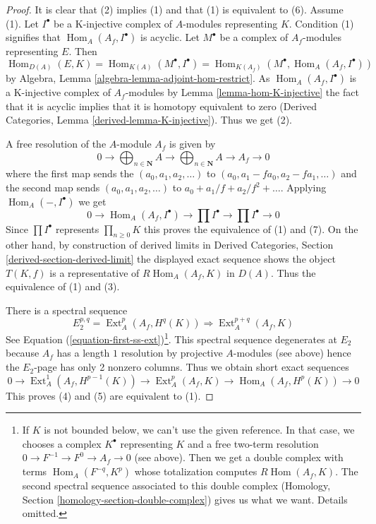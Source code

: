 \documentclass[10pt,a4paper]{amsart}
\theoremstyle{plain}
\theoremstyle{definition}
\theoremstyle{remark}
\numberwithin{equation}{subsection}
\def\Hom{\mathop{\mathrm{Hom}}\nolimits}
\def\Ext{\mathop{\mathrm{Ext}}\nolimits}
\begin{document}
\begin{proof}
It is clear that (2) implies (1) and that (1) is equivalent to (6). Assume (1).
Let $I^\bullet$ be a K-injective complex of $A$-modules representing $K$.
Condition (1) signifies that $\Hom_A(A_f, I^\bullet)$ is acyclic.
Let $M^\bullet$ be a complex of $A_f$-modules representing $E$.
Then
$$
\Hom_{D(A)}(E, K) =
\Hom_{K(A)}(M^\bullet, I^\bullet) =
\Hom_{K(A_f)}(M^\bullet, \Hom_A(A_f, I^\bullet))
$$
by Algebra, Lemma \ref{algebra-lemma-adjoint-hom-restrict}.
As $\Hom_A(A_f, I^\bullet)$ is a K-injective complex of
$A_f$-modules by Lemma \ref{lemma-hom-K-injective}
the fact that it is acyclic implies that it is homotopy equivalent to zero
(Derived Categories, Lemma \ref{derived-lemma-K-injective}).
Thus we get (2).

\medskip\noindent
A free resolution of the $A$-module $A_f$ is given by
$$
0 \to \bigoplus\nolimits_{n \in \mathbf{N}} A \to
\bigoplus\nolimits_{n \in \mathbf{N}} A
\to A_f \to 0
$$
where the first map sends the $(a_0, a_1, a_2, \ldots)$ to
$(a_0, a_1 - fa_0, a_2 - fa_1, \ldots)$ and the second map sends
$(a_0, a_1, a_2, \ldots)$ to $a_0 + a_1/f + a_2/f^2 + \ldots$.
Applying $\Hom_A(-, I^\bullet)$ we get
$$
0 \to \Hom_A(A_f, I^\bullet) \to \prod I^\bullet \to \prod I^\bullet \to 0
$$
Since $\prod I^\bullet$ represents $\prod_{n \geq 0} K$
this proves the equivalence of (1) and (7). On the other hand,
by construction of derived limits in
Derived Categories, Section \ref{derived-section-derived-limit}
the displayed exact sequence shows the object $T(K, f)$
is a representative of $R\Hom_A(A_f, K)$ in $D(A)$.
Thus the equivalence of (1) and (3).

\medskip\noindent
There is a spectral sequence
$$
E_2^{p, q} = \Ext^p_A(A_f, H^q(K)) \Rightarrow
\Ext^{p + q}_A(A_f, K)
$$
See Equation (\ref{equation-first-ss-ext})\footnote{If $K$ is not
bounded below, we can't use the given reference.
In that case, we chooses a complex $K^\bullet$ representing $K$
and a free two-term resolution $0 \to F^{-1} \to F^0 \to A_f \to 0$
(see above). Then we get a double complex with terms $\Hom_A(F^{-q}, K^p)$
whose totalization computes $R\Hom(A_f, K)$. The second spectral sequence
associated to this double complex (Homology, Section
\ref{homology-section-double-complex})
gives us what we want. Details omitted.}.
This spectral sequence degenerates at $E_2$ because
$A_f$ has a length $1$ resolution by projective $A$-modules (see above)
hence the $E_2$-page has only 2 nonzero columns. Thus we obtain short exact
sequences
$$
0 \to \Ext^1_A(A_f, H^{p - 1}(K)) \to
\Ext^p_A(A_f, K) \to
\Hom_A(A_f, H^p(K)) \to 0
$$
This proves (4) and (5) are equivalent to (1).
\end{proof}
\end{document}

